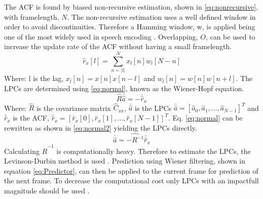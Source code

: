 The ACF is found by biased non-recursive estimation, shown in \autoref{eq:nonrecursive}, with framelength, $N$. The non-recursive estimation uses a well defined window in order to avoid discontinuities. Therefore a Hamming window, w, is applied being one of the most widely used in speech encoding \cite{LinearPrediction}. Overlapping, $O$, can be used to increase the update rate of the ACF without having a small framelength.  
\begin{equation}\label{eq:nonrecursive}
\hat{r}_x[l] = \sum^{N}_{n=\left| l\right|} x_l[n]w_l[N-n]
\end{equation}
Where: l is the lag, $x_l[n]=x[n]x[n-l]$ and $w_l[n]=w[n]w[n+l]$. The LPCs are determined using \autoref{eq:normal}, known as the Wiener-Hopf equation.
\begin{equation}\label{eq:normal}
\hat{R}  \bar{\hat{a}} = -\bar{\hat{r}}_x
\end{equation}
Where: $\hat{R}$ is the covariance matrix $\hat{C}_{xx}$, $\bar{\hat{a}}$ is the LPCs $\bar{\hat{a}} = [\hat{a}_0 , \hat{a}_1, \dotsc, \hat{a}_{N-1}]^T$ and $\bar{\hat{r}}_x$ is the ACF, $\bar{\hat{r}}_x = [\hat{r}_x[0] , \hat{r}_x[1], \dotsc, \hat{r}_x[N-1]]^T$. Eq. \ref{eq:normal} can be rewritten as shown in \autoref{eq:normal2} yielding the LPCs directly.  
 \begin{equation}\label{eq:normal2}
\bar{\hat{a}} = \hat{-R^{-1}} \bar{\hat{r}}_x
\end{equation}
Calculating $\hat{R}^{-1}$ is computationally heavy. Therefore to estimate the LPCs, the Levinson-Durbin method is used \cite{LinearPrediction}. Prediction using Wiener filtering, shown in equation \ref{eq:Predictor}, can then be applied to the current frame for prediction of the next frame. To decrease the computational cost only LPCs with an impactfull magnitude should be used \cite{Speech}. 

